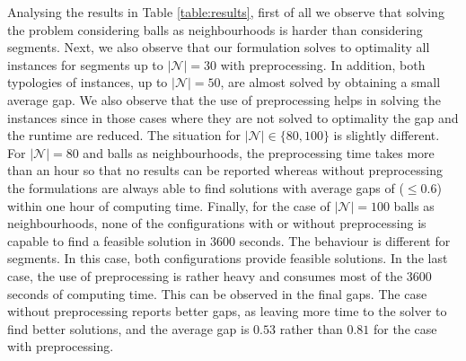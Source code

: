 \documentclass[a4paper,  review, authoryear, 1p.]{elsarticle}
\begin{document}
	Analysing the results in Table \ref{table:results}, first of all we observe that solving the problem considering balls as neighbourhoods is harder than considering segments. Next, we also observe that our formulation solves to optimality all instances for segments up to $|\mathcal{N}|=30$ with preprocessing. In addition, both typologies of instances, up to $|\mathcal{N}|=50$, are almost solved by obtaining a small average gap. %
	We also observe that the use of preprocessing helps in solving the instances since in those cases where they are not solved to optimality the gap and the runtime are reduced. The situation for $|\mathcal{N}|\in \{80,100\}$ is slightly different. For $|\mathcal{N}|=80$ and balls as neighbourhoods, the preprocessing time takes more than an hour so that no results can be reported whereas without preprocessing the formulations are always able to find solutions with average gaps of ($\le 0.6$) within one hour of computing time.  %
	Finally, for the case of $|\mathcal{N}|=100$ balls as neighbourhoods, none of the configurations with or without preprocessing is capable to find a feasible solution in 3600 seconds. The behaviour is different for segments. In this case, both configurations provide feasible solutions. In the last case, the use of preprocessing is rather heavy and consumes most of the 3600 seconds of computing time. This can be observed in the final gaps. The case without preprocessing reports better gaps, as leaving more time to the solver to find better solutions, and the average gap is $0.53$ rather than $0.81$ for the case with preprocessing.
	
\end{document}
